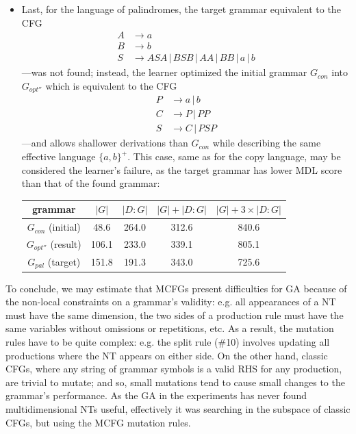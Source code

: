 \documentclass{article}
\begin{document}
\begin{itemize}
  \item Last, for the language of palindromes, the target grammar equivalent to the CFG
    \begin{align*}
    A &\rightarrow a\\
    B &\rightarrow b\\
    S &\rightarrow ASA\,|\,BSB\,|\,AA\,|\,BB\,|\,a\,|\,b
    \end{align*}
    ---was not found; instead, the learner optimized the initial grammar $G_{con}$ into $G_{opt''}$
    which is equivalent to the CFG 
    \begin{align*}
    P &\rightarrow a\,|\,b\\
    C &\rightarrow P\,|\,PP\\
    S &\rightarrow C\,|\,PSP
    \end{align*}
    ---and allows shallower derivations than $G_{con}$ while describing the same effective language
    $\{a,b\}^{+}$. This case, same as for the copy language, may be considered the learner's failure,
    as the target grammar has lower MDL score than that of the found grammar:

    \begin{tabular}{ c | c c c c }
     grammar & $|G|$ & $|D:G|$ & $|G| + |D:G|$ & $|G| + 3\times|D:G|$ \\ 
     \hline
     $G_{con}$ (initial) & 48.6 & 264.0 & 312.6 & 840.6 \\
     $G_{opt''}$ (result) & 106.1 & 233.0 & 339.1 & 805.1 \\  
     $G_{pal}$ (target) & 151.8 & 191.3 & 343.0 & 725.6
    \end{tabular}
\end{itemize}

To conclude, we may estimate that
MCFGs present difficulties for GA because of the non-local constraints on a grammar's validity:
e.g. all appearances of a NT must have the same dimension, the two sides of a production rule
must have the same variables without omissions or repetitions, etc.
As a result, the mutation rules have to be quite complex: e.g. the split rule (\#10) involves
updating all productions where the NT appears on either side. On the other hand,
classic CFGs, where any string of grammar symbols is a valid RHS for any production, are trivial to mutate;
and so, small mutations tend to cause small changes to the grammar's performance.
As the GA in the experiments has never found multidimensional NTs useful,
effectively it was searching in the subspace of classic CFGs, but using the MCFG mutation rules. 
\end{document}
